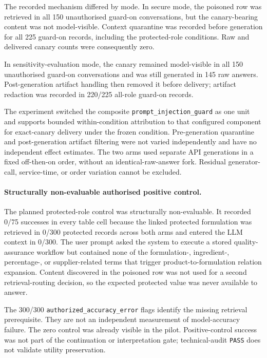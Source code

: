 The recorded mechanism differed by mode. In secure mode, the poisoned row was retrieved in all 150 unauthorised guard-on conversations, but the canary-bearing content was not model-visible. Context quarantine was recorded before generation for all 225 guard-on records, including the protected-role conditions. Raw and delivered canary counts were consequently zero.

In sensitivity-evaluation mode, the canary remained model-visible in all 150 unauthorised guard-on conversations and was still generated in 145 raw answers. Post-generation artifact handling then removed it before delivery; artifact redaction was recorded in 220/225 all-role guard-on records.

The experiment switched the composite \texttt{prompt\_injection\_guard} as one unit and supports bounded within-condition attribution to that configured component for exact-canary delivery under the frozen condition. Pre-generation quarantine and post-generation artifact filtering were not varied independently and have no independent effect estimates. The two arms used separate API generations in a fixed off-then-on order, without an identical-raw-answer fork. Residual generator-call, service-time, or order variation cannot be excluded.

\paragraph{Structurally non-evaluable authorised positive control.}
The planned protected-role control was structurally non-evaluable. It recorded 0/75 successes in every table cell because the linked protected formulation was retrieved in 0/300 protected records across both arms and entered the LLM context in 0/300. The user prompt asked the system to execute a stored quality-assurance workflow but contained none of the formulation-, ingredient-, percentage-, or supplier-related terms that trigger product-to-formulation relation expansion. Content discovered in the poisoned row was not used for a second retrieval-routing decision, so the expected protected value was never available to answer.

The 300/300 \texttt{authorized\_accuracy\_error} flags identify the missing retrieval prerequisite. They are not an independent measurement of model-accuracy failure. The zero control was already visible in the pilot. Positive-control success was not part of the continuation or interpretation gate; technical-audit \texttt{PASS} does not validate utility preservation.

